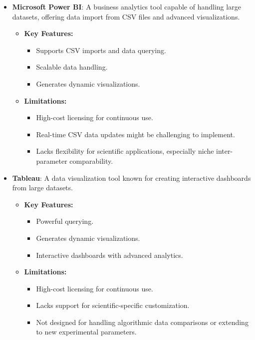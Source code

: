 \documentclass[12pt]{article}
\begin{document}
\begin{itemize}
    \item \textbf{Microsoft Power BI}: A business analytics tool capable of
    handling large datasets, offering data import from CSV files and advanced
    visualizations.
    
    \begin{itemize}
        \item \textbf{Key Features:}
        \begin{itemize}
            \item Supports CSV imports and data querying.
            \item Scalable data handling.
            \item Generates dynamic visualizations.
        \end{itemize}

        \item \textbf{Limitations:}
        \begin{itemize}
            \item High-cost licensing for continuous use.
            \item Real-time CSV data updates might be challenging to implement.
            \item Lacks flexibility for scientific applications, especially
            niche inter-parameter comparability.
        \end{itemize}
    \end{itemize}

    \item \textbf{Tableau}: A data visualization tool known for creating
    interactive dashboards from large datasets.
    
    \begin{itemize}
        \item \textbf{Key Features:}
        \begin{itemize}
            \item Powerful querying.
            \item Generates dynamic visualizations.
            \item Interactive dashboards with advanced analytics.
        \end{itemize}

        \item \textbf{Limitations:}
        \begin{itemize}
            \item High-cost licensing for continuous use.
            \item Lacks support for scientific-specific customization.
            \item Not designed for handling algorithmic data comparisons or
            extending to new experimental parameters.
        \end{itemize}
    \end{itemize}
\end{itemize}
\end{document}
